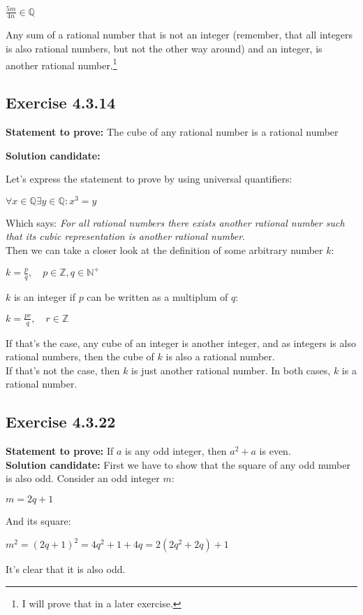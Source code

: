 \documentclass{report}
\newcommand{\cent}[1]{\begin{center}#1\end{center}}
\newcommand{\doubleZ}{\mathbb{Z}}
\newcommand{\doubleN}{\mathbb{N}}
\newcommand{\doubleQ}{\mathbb{Q}}
\newcommand{\In}{\! \in \!}
\newcommand{\Prove}{\textbf{Statement to prove: }}
\newcommand{\solution}{\textbf{Solution candidate: }}
\newcommand{\QED}{\boxed{}}
\newcommand{\Exercise}[1]{\subsection{Exercise #1}}
\begin{document}
	\cent{$\frac{5m}{4n} \in \doubleQ$} 
	
	Any sum of a rational number that is not an integer (remember, that all integers is also rational numbers, but not the other way around) and an integer, is another rational number.\footnote{I will prove that in a later exercise.}\\
	\QED
	
	\Exercise{4.3.14}
	
	\Prove
	The cube of any rational number is a rational number
	
	\solution
	
	Let's express the statement to prove by using universal quantifiers:
	
	\cent{$\forall x \In \doubleQ \exists y \In \doubleQ : x^3 = y$}
	
	Which says: \textit{For all rational numbers there exists another rational number such that its cubic representation is another rational number}.\\
	
	Then we can take a closer look at the definition of some arbitrary number $k$:
	
	\cent{$k = \frac{p}{q}, \quad p \In \doubleZ, q \In \doubleN^+$}
	
	$k$ is an integer if $p$ can be written as a multiplum of $q$:
	
	\cent{$k = \frac{pr}{q}, \quad r \In \doubleZ$}
	
	If that's the case, any cube of an integer is another integer, and as integers is also rational numbers, then the cube of $k$ is also a rational number.\\
	
	If that's not the case, then $k$ is just another rational number. In both cases, $k$ is a rational number.\\
	\QED
	
	\Exercise{4.3.22}
	
	\Prove
	If $a$ is any odd integer, then $a^2 + a$ is even.\\
	
	\solution
	First we have to show that the square of any odd number is also odd. Consider an odd integer $m$:
	
	\cent{$m = 2q + 1$}
	
	And its square:
	
	\cent{$m^2 = (2q+1)^2 = 4q^2+1+4q = 2(2q^2 + 2q) + 1$}
	
	It's clear that it is also odd.\\
	
\end{document}
